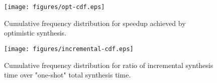 %
%

\begin{figure}
	\texttt{[image: figures/opt-cdf.eps]}
	\caption{Cumulative frequency distribution for speedup achieved by optimistic synthesis.}
	\label{fig:opt-cdf}
\end{figure}
\begin{figure}
	\texttt{[image: figures/incremental-cdf.eps]}
	\caption{Cumulative frequency distribution for ratio of incremental synthesis time over "one-shot" total synthesis time.}
	\label{fig:incremental-cdf}
\end{figure}




